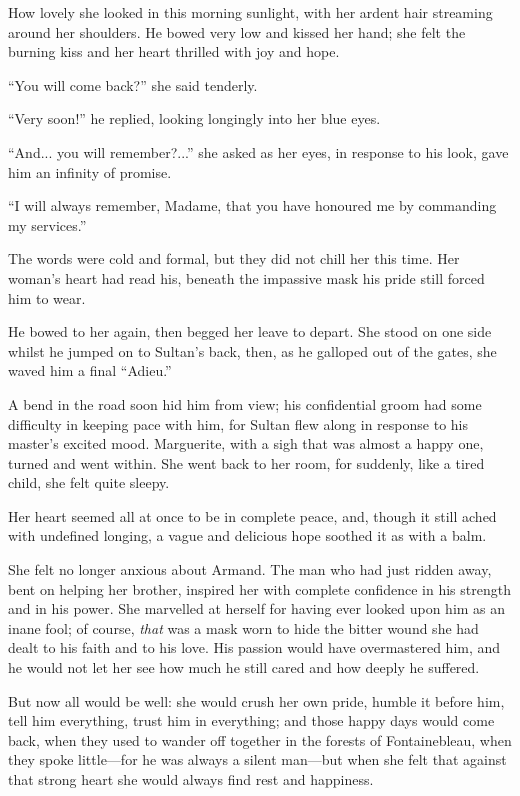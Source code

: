 \documentclass[paper=a5,BCOR=7mm,twoside,DIV=calc,12pt,usegeometry,chapterprefix,endperiod,headings=big]{scrbook}
\begin{document}
How lovely she looked in this morning sunlight, with her ardent hair streaming around her shoulders. He bowed very low and kissed her hand; she felt the burning kiss and her heart thrilled with joy and hope.

\enquote{You will come back?} she said tenderly.

\enquote{Very soon!} he replied, looking longingly into her blue eyes.

\enquote{And... you will remember?...} she asked as her eyes, in response to his look, gave him an infinity of promise.

\enquote{I will always remember, Madame, that you have honoured me by commanding my services.}

The words were cold and formal, but they did not chill her this time. Her woman's heart had read his, beneath the impassive mask his pride still forced him to wear.

He bowed to her again, then begged her leave to depart. She stood on one side whilst he jumped on to Sultan's back, then, as he galloped out of the gates, she waved him a final \enquote{Adieu.}

A bend in the road soon hid him from view; his confidential groom had some difficulty in keeping pace with him, for Sultan flew along in response to his master's excited mood. Marguerite, with a sigh that was almost a happy one, turned and went within. She went back to her room, for suddenly, like a tired child, she felt quite sleepy.

Her heart seemed all at once to be in complete peace, and, though it still ached with undefined longing, a vague and delicious hope soothed it as with a balm.

She felt no longer anxious about Armand. The man who had just ridden away, bent on helping her brother, inspired her with complete confidence in his strength and in his power. She marvelled at herself for having ever looked upon him as an inane fool; of course, \textit{that} was a mask worn to hide the bitter wound she had dealt to his faith and to his love. His passion would have overmastered him, and he would not let her see how much he still cared and how deeply he suffered.

But now all would be well: she would crush her own pride, humble it before him, tell him everything, trust him in everything; and those happy days would come back, when they used to wander off together in the forests of Fontainebleau, when they spoke little---for he was always a silent man---but when she felt that against that strong heart she would always find rest and happiness.
\end{document}

